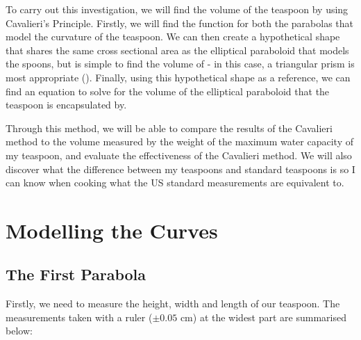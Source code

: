 \documentclass[12pt]{article}
\begin{document}
To carry out this investigation, we will find the volume of the teaspoon by using Cavalieri's Principle. Firstly, we will find the function for both the parabolas that model the curvature of the teaspoon. We can then create a hypothetical shape that shares the same cross sectional area as the elliptical paraboloid that models the spoons, but is simple to find the volume of - in this case, a triangular prism is most appropriate (\citeauthor{bogomolny}). Finally, using this hypothetical shape as a reference, we can find an equation to solve for the volume of the elliptical paraboloid that the teaspoon is encapsulated by.

Through this method, we will be able to compare the results of the Cavalieri method to the volume measured by the weight of the maximum water capacity of my teaspoon, and evaluate the effectiveness of the Cavalieri method. We will also discover what the difference between my teaspoons and standard teaspoons is so I can know when cooking what the US standard measurements are equivalent to. 

\section{Modelling the Curves}

\subsection{The First Parabola}

Firstly, we need to measure the height, width and length of our teaspoon. The measurements taken with a ruler ($\pm 0.05$ cm) at the widest part are summarised below:
\end{document}

